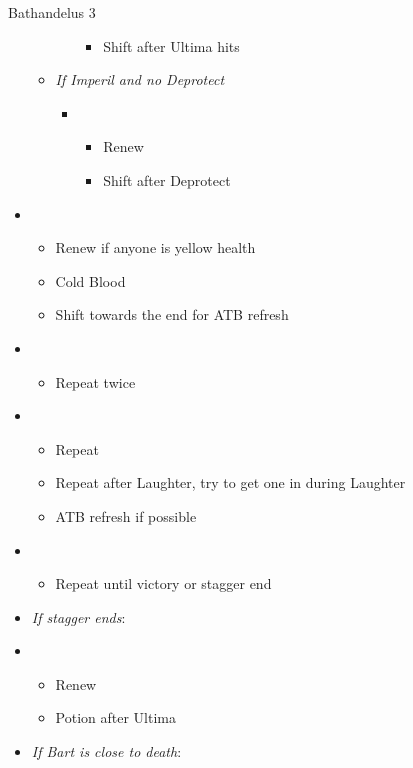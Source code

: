 \begin{battle}{Bathandelus 3}
\begin{multicols}{2}
\begin{itemize}
\begin{itemize}
\begin{itemize}
\begin{itemize}
                \item Shift after Ultima hits
            \end{itemize}
        \end{itemize}
        \item \textit{If Imperil and no Deprotect}
        \begin{itemize}
            \item \fifth
            \begin{itemize}
                \item Renew
                \item Shift after Deprotect
            \end{itemize}
        \end{itemize}
    \end{itemize}
    \item \sixth
    \begin{itemize}
        \item Renew if anyone is yellow health
        \item Cold Blood
        \item Shift towards the end for ATB refresh
    \end{itemize}
    \item \second
    \begin{itemize}
        \item Repeat twice
    \end{itemize}
    \item \first
    \begin{itemize}
        \item Repeat
        \item Repeat after Laughter, try to get one in during Laughter
        \item ATB refresh if possible
    \end{itemize}
    \item \second
    \begin{itemize}
        \item Repeat until victory or stagger end
    \end{itemize}
    \columnbreak
    \item \textit{If stagger ends}:
    \item \third
    \begin{itemize}
        \item Renew
        \item Potion after Ultima
    \end{itemize}
    \item \textit{If Bart is close to death}:

\end{itemize}
\end{multicols}
\end{battle}
